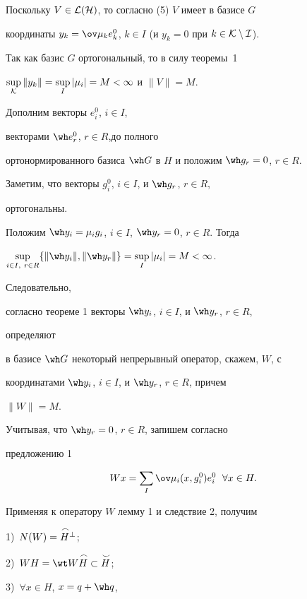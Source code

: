 \begin{pf} 


Поскольку $V\in\cal L(H)$, то согласно (5) $V$ имеет в базисе $G$ 


координаты $y_k=\ov\mu_k e^0_k$, $k\in I$ (и $y_k=0$ при $k\in\cal 


K\setminus I$). 


Так как базис $G$ ортогональный, то в силу теоремы~1\; 


$\sup\limits_{\cal K}\|y_k\|=\sup\limits_I|\mu_i|=M<\infty$ и $\|V\|=M$.


Дополним векторы $e^0_i$, $i\in I$,


векторами $\wh e^0_r$, $r{\in}R$,\linebreak до полного 


ортонормированного базиса $\wh G$ в $H$ и положим $\wh g_r=0$, $r\in R$. 


Заметим, что векторы $g^0_i$, $i\in I$, и $\wh g_r$, $r\in R$, 


ортогональны. 


Положим $\wh y_i=\mu_i g_i$, $i\in I$, $\wh y_r=0$, $r\in R$. Тогда 


$\sup\limits_{i\in I,\ r\in R}\{\|\wh y_i\|,\|\wh y_r\|\}= 


\sup\limits_I|\mu_i|=M<\infty$. 


Следовательно, 


согласно теореме 1 векторы $\wh y_i$, $i\in I$, и $\wh y_r$, $r\in R$, 


определяют 


в базисе $\wh G$ некоторый непрерывный оператор, скажем, $W$, с 


координатами $\wh y_i$, $i\in I$, и $\wh y_r$, $r\in R$, причем 


$\|W\|=M$. 


Учитывая, что $\wh y_r=0$, $r\in R$, запишем согласно


предложению 1


\begin{equation} 


W x=\sum_I\ov\mu_i(x,g^0_i)e^0_i\ \; \forall x\in H. 


\end{equation} 


Применяя к оператору $W$ лемму 1 и следствие 2, получим 


1)~$N(W)=\overset{\,\frown}{H}{}^\bot$; 


2)~$W H=\wt W\up{\frown}{H}\subset\up{\smile}{H}$; 


3)~$\forall x\in H$, $x=q+\wh q$, 



\end{pf}
